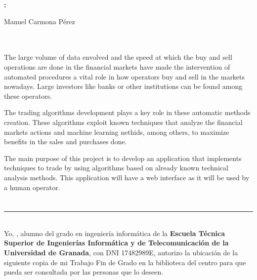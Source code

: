 \begin{center}
{\large\bfseries \myTitle: \mySubtitleEnglish}\\
\end{center}
\begin{center}
Manuel Carmona Pérez\\
\end{center}

\\

\vspace{0.7cm}
\\

The large volume of data envolved and the speed at which the buy and sell operations are done in the financial markets have made the intervention of automated procedures a vital role in how operators buy and sell in the markets nowadays. Large investors like banks or other institutions can be found among these operators. \newline

The trading algorithms development plays a key role in these automatic methods creation. These algorithms exploit known techniques that analyze the financial markets actions and machine learning nethids, among others, to maximize benefits in the sales and purchases done. \newline

The main purpose of this project is to develop an application that implements techniques to trade by using algorithms based on already known technical analysis methods. This application will have a web interface as it will be used by a human operator.

\chapter*{}
\thispagestyle{empty}

\noindent\rule[-1ex]{\textwidth}{2pt}\\[4.5ex]

Yo, \textbf{\myName}, alumno del grado en ingeniería informática de la \textbf{Escuela Técnica Superior
de Ingenierías Informática y de Telecomunicación de la Universidad de Granada}, con DNI 17482989E, autorizo la
ubicación de la siguiente copia de mi Trabajo Fin de Grado en la biblioteca del centro para que pueda ser
consultada por las personas que lo deseen.

